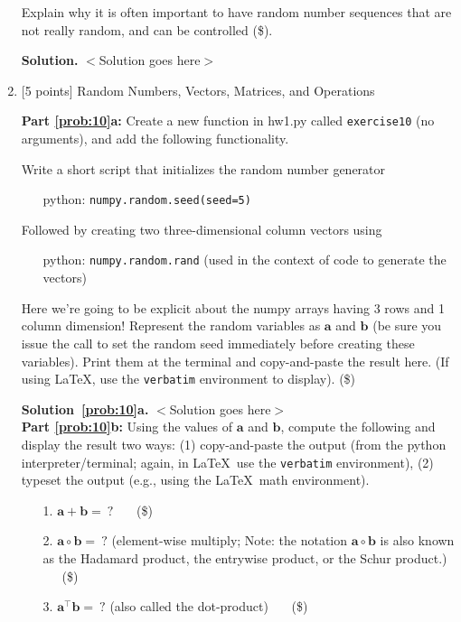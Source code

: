 \documentclass[10pt]{article}
\begin{document}
\begin{enumerate}
Explain why it is often important to have random number sequences that are not really random, and can be controlled (\$).

{\bf Solution.} $<$Solution goes here$>$\\


\item \label{prob:10} [5 points] Random Numbers, Vectors, Matrices, and Operations

{\bf Part \ref{prob:10}a:} Create a new function in hw1.py called {\tt exercise10} (no arguments), and add the following functionality.

Write a short script that initializes the random number generator
\begin{itemize}
\item[] python: {\tt numpy.random.seed(seed=5)}
\end{itemize}
Followed by creating two three-dimensional column vectors using
\begin{itemize}
\item[] python: {\tt numpy.random.rand} (used in the context of code to generate the vectors)
\end{itemize}
Here we're going to be explicit about the numpy arrays having 3 rows and 1 column dimension!
Represent the random variables as $\mathbf{a}$ and $\mathbf{b}$ (be sure you issue the call to set the random seed immediately before creating these variables).  Print them at the terminal and copy-and-paste the result here. (If using \LaTeX, use the {\tt verbatim} environment to display). (\$)

{\bf Solution~\ref{prob:10}a.} $<$Solution goes here$>$\\

{\bf Part \ref{prob:10}b:} Using the values of $\mathbf{a}$ and $\mathbf{b}$, compute the following and display the result two ways: (1) copy-and-paste the output (from the python interpreter/terminal; again, in \LaTeX~use the {\tt verbatim} environment), (2) typeset the output (e.g., using the \LaTeX~math environment).
\begin{enumerate}
\item[1.] $\mathbf{a} + \mathbf{b} = ~?$ ~~~(\$)
\item[2.] $\mathbf{a} \circ \mathbf{b} = ~?$  (element-wise multiply; Note: the notation $\mathbf{a} \circ \mathbf{b}$ is also known as the Hadamard product, the entrywise product, or the Schur product.) ~~~(\$)
\item[3.] $\mathbf{a}^\top \mathbf{b} = ~?$  (also called the dot-product) ~~~(\$)
\end{enumerate}


\end{enumerate}
\end{document}
